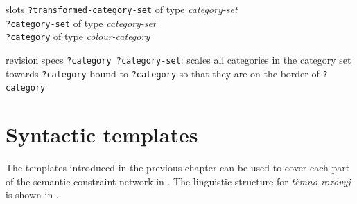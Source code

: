 \begin{explanation}{slots}
  \verb+?transformed-category-set+ of type \emph{category-set} \\
  \verb+?category-set+ of type \emph{category-set} \\
  \verb+?category+ of type \emph{colour-category}
\end{explanation}

\begin{explanation}{revision specs}
  \verb+?category ?category-set+: scales all categories in the category
  set towards \verb+?category+ bound to \verb+?category+ so that they
  are on the border of \verb+?category+
\end{explanation}

\section{Syntactic templates}

The templates introduced in the previous chapter can be used to cover
each part of the semantic constraint network in . The linguistic structure for
\textit{t\"emno-rozovyj} is shown in .

